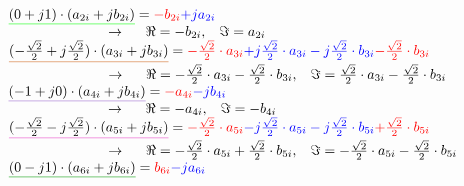 \noindent$\mathunderline{green}{(0+j1) \cdot (a_{2i}+jb_{2i})} = \textcolor{red}{-b_{2i}}\textcolor{blue}{+ja_{2i}}$\\

$\hspace{2.5cm}\rightarrow \hspace{0.5cm} \Re=-b_{2i}, \hspace{0.3cm}\Im=a_{2i}$\\

\noindent$\mathunderline{cinnamon}{(-\frac{\sqrt{2}}{2}+j\frac{\sqrt{2}}{2}) \cdot (a_{3i}+jb_{3i})} = \textcolor{red}{-\frac{\sqrt{2}}{2} \cdot a_{3i}} \textcolor{blue}{+ j\frac{\sqrt{2}}{2} \cdot a_{3i} -j\frac{\sqrt{2}}{2} \cdot b_{3i}} \textcolor{red}{- \frac{\sqrt{2}}{2} \cdot b_{3i}}$\\

$\hspace{2.5cm}\rightarrow \hspace{0.5cm} \Re=-\frac{\sqrt{2}}{2} \cdot a_{3i} -\frac{\sqrt{2}}{2} \cdot b_{3i}, \hspace{0.3cm} \Im=\frac{\sqrt{2}}{2} \cdot a_{3i} - \frac{\sqrt{2}}{2} \cdot b_{3i}$\\

\noindent$\mathunderline{lila}{(-1+j0) \cdot (a_{4i}+jb_{4i})} = \textcolor{red}{-a_{4i}} \textcolor{blue}{-jb_{4i}}$\\

$\hspace{2.5cm}\rightarrow \hspace{0.5cm} \Re=-a_{4i}, \hspace{0.3cm}\Im=-b_{4i}$\\

\noindent$\mathunderline{pink}{(-\frac{\sqrt{2}}{2}-j\frac{\sqrt{2}}{2}) \cdot (a_{5i}+jb_{5i})} = \textcolor{red}{-\frac{\sqrt{2}}{2} \cdot a_{5i}} \textcolor{blue}{-j\frac{\sqrt{2}}{2} \cdot a_{5i} -j\frac{\sqrt{2}}{2} \cdot b_{5i}} \textcolor{red}{+\frac{\sqrt{2}}{2} \cdot b_{5i}}$\\

$\hspace{2.5cm}\rightarrow \hspace{0.5cm} \Re=-\frac{\sqrt{2}}{2} \cdot a_{5i} +\frac{\sqrt{2}}{2} \cdot b_{5i}, \hspace{0.3cm} \Im=-\frac{\sqrt{2}}{2} \cdot a_{5i} - \frac{\sqrt{2}}{2} \cdot b_{5i}$\\

\noindent$\mathunderline{mygreen}{(0-j1) \cdot (a_{6i}+jb_{6i})} = \textcolor{red}{b_{6i}} \textcolor{blue}{- ja_{6i}}$\\

